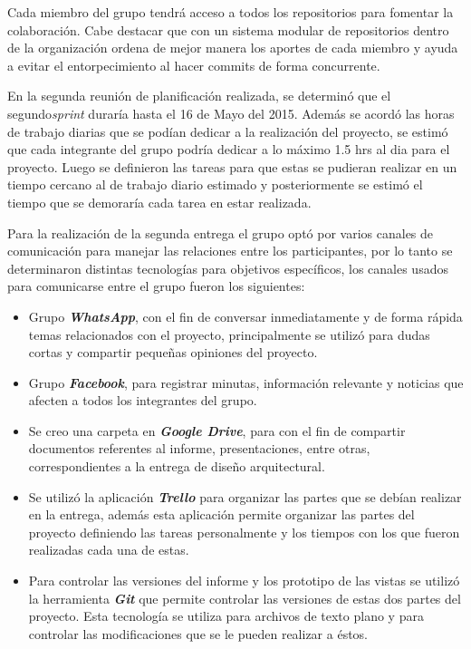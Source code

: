\documentclass{memoria}
\begin{document}
Cada miembro del grupo tendrá acceso a todos los repositorios para fomentar la colaboración. Cabe destacar que con un sistema modular de repositorios dentro de la organización ordena de mejor manera los aportes de cada miembro y ayuda a evitar el entorpecimiento al hacer commits de forma concurrente.

\newpage


En la segunda reunión de planificación realizada, se determinó que el segundo\textsl{sprint} duraría hasta el 16 de Mayo del 2015. Además se acordó las horas de trabajo diarias que se podían dedicar a la realización del proyecto, se estimó que cada integrante del grupo podría dedicar a lo máximo 1.5 hrs al dia para el proyecto. Luego se definieron las tareas para que estas se pudieran realizar en un tiempo cercano al de trabajo diario estimado y posteriormente se estimó el tiempo que se demoraría cada tarea en estar realizada.

Para la realización de la segunda entrega el grupo optó por varios canales de comunicación para manejar las relaciones entre los participantes, por lo tanto se determinaron distintas tecnologías para objetivos específicos, los canales usados para comunicarse entre el grupo fueron los siguientes:


\begin{itemize}
	\item Grupo \textbf{\textsl{WhatsApp}}, con el fin de conversar inmediatamente y de forma rápida temas relacionados con el proyecto, principalmente se utilizó para dudas cortas y compartir pequeñas opiniones del proyecto.
	\item Grupo \textbf{\textsl{Facebook}}, para registrar minutas, información relevante y noticias que afecten a todos los integrantes del grupo.
	\item Se creo una carpeta en \textbf{\textsl{Google Drive}}, para con el fin de compartir documentos referentes al informe, presentaciones, entre otras, correspondientes a la entrega de diseño arquitectural.  
	\item Se utilizó la aplicación \textbf{\textsl{Trello}} para organizar las partes que se debían realizar en la entrega, además esta aplicación permite organizar las partes del proyecto definiendo las tareas personalmente y los tiempos con los que fueron realizadas cada una de estas.
	\item Para controlar las versiones del informe y los prototipo de las vistas se utilizó la herramienta \textbf{\textsl{Git}} que permite controlar las versiones de estas dos partes del proyecto. Esta tecnología se utiliza para archivos de texto plano y para controlar las modificaciones que se le pueden realizar a éstos.
\end{itemize}
\end{document}
